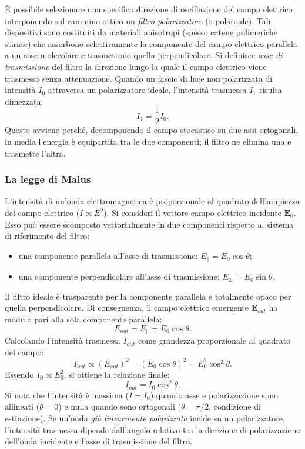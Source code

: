\documentclass[a4paper,11pt]{report}
\begin{document}
È possibile selezionare una specifica direzione di oscillazione del campo elettrico interponendo sul cammino ottico un \textit{filtro polarizzatore} (o polaroide). Tali dispositivi sono costituiti da materiali anisotropi (spesso catene polimeriche stirate) che assorbono selettivamente la componente del campo elettrico parallela a un asse molecolare e trasmettono quella perpendicolare.
Si definisce \textit{asse di trasmissione} del filtro la direzione lungo la quale il campo elettrico viene trasmesso senza attenuazione.
Quando un fascio di luce non polarizzata di intensità $I_0$ attraversa un polarizzatore ideale, l'intensità trasmessa $I_1$ risulta dimezzata:
\begin{equation}
I_1 = \frac{1}{2} I_0.
\end{equation}
Questo avviene perché, decomponendo il campo stocastico su due assi ortogonali, in media l'energia è equipartita tra le due componenti; il filtro ne elimina una e trasmette l'altra.
\subsubsection{La legge di Malus}
L'intensità di un'onda elettromagnetica è proporzionale al quadrato dell'ampiezza del campo elettrico ($I \propto E^2$).
Si consideri il vettore campo elettrico incidente $\bm{E}_0$. Esso può essere scomposto vettorialmente in due componenti rispetto al sistema di riferimento del filtro:
\begin{itemize}
    \item una componente parallela all'asse di trasmissione: $E_{\parallel} = E_0 \cos \theta$;
    \item una componente perpendicolare all'asse di trasmissione: $E_{\perp} = E_0 \sin \theta$.
\end{itemize}
Il filtro ideale è trasparente per la componente parallela e totalmente opaco per quella perpendicolare. Di conseguenza, il campo elettrico emergente $\bm{E}_{out}$ ha modulo pari alla sola componente parallela:
\begin{equation}
E_{out} = E_{\parallel} = E_0 \cos \theta.
\end{equation}
Calcolando l'intensità trasmessa $I_{out}$ come grandezza proporzionale al quadrato del campo:
\begin{equation}
I_{out} \propto (E_{out})^2 = (E_0 \cos \theta)^2 = E_0^2 \cos^2 \theta.
\end{equation}
Essendo $I_0 \propto E_0^2$, si ottiene la relazione finale:
\begin{equation}
I_{out} = I_0 \cos^2 \theta.
\end{equation}
Si nota che l'intensità è massima ($I=I_0$) quando asse e polarizzazione sono allineati ($\theta = 0$) e nulla quando sono ortogonali ($\theta = \pi/2$, condizione di estinzione).
Se un'onda \textit{già linearmente polarizzata} incide su un polarizzatore, l'intensità trasmessa dipende dall'angolo relativo tra la direzione di polarizzazione dell'onda incidente e l'asse di trasmissione del filtro. 
\end{document}
